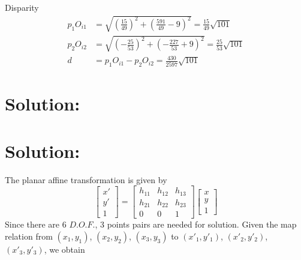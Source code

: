 \documentclass[12pt]{article}
\begin{document}
Disparity
\begin{equation*}
\begin{aligned}
    p_1O_{i1} &= \sqrt{(\frac{15}{49})^2 + (\frac{591}{49} - 9)^2} = \frac{15}{49}\sqrt{101}\\
    p_2O_{i2} &= \sqrt{(-\frac{25}{53})^2 + (-\frac{227}{53} + 9)^2} = \frac{25}{53}\sqrt{101}\\
    d &= p_1O_{i1} - p_2O_{i2} = \frac{430}{2597}\sqrt{101}
\end{aligned}
\end{equation*}

\section{Solution:}





\section{Solution:}
The planar affine transformation is given by
\begin{equation*}
\left[ \begin{array}{c}
x'\\
y'\\
1
\end{array} \right] = \left[ \begin{array}{ccc}
h_{11} & h_{12} & h_{13} \\
h_{21} & h_{22} & h_{23} \\
0 & 0 & 1
\end{array} \right]\left[ \begin{array}{c}
x\\
y\\
1
\end{array} \right] 
\end{equation*}
Since there are 6 $D.O.F.$, 3 points pairs are needed for solution. Given the map relation from $(x_1, y_1)$, $(x_2, y_2)$, $(x_3, y_3)$ to $(x'_1, y'_1)$, $(x'_2, y'_2)$, $(x'_3, y'_3)$, we obtain
\end{document}
